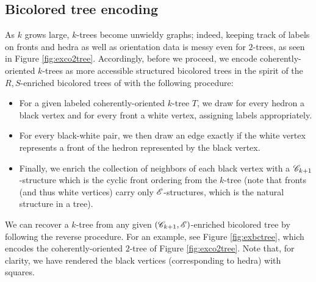 \documentclass[sectionflow,singlespace,twoside,boldmathhdr]{brandiss} %
\numberwithin{section}{chapter}
\numberwithin{figure}{chapter}
\begin{document}
\subsection{Bicolored tree encoding}\label{ss:bctree}
As $k$ grows large, $k$-trees become unwieldy graphs; indeed, keeping track of labels on fronts and hedra as well as orientation data is messy even for $2$-trees, as seen in Figure \ref{fig:exco2tree}.
Accordingly, before we proceed, we encode coherently-oriented $k$-trees as more accessible structured bicolored trees in the spirit of the $R, S$-enriched bicolored trees of \cite[\S 3.2]{bll:species} with the following procedure:
\begin{itemize}
  \item For a given labeled coherently-oriented $k$-tree $T$, we draw for every hedron a black vertex and for every front a white vertex, assigning labels appropriately.
  \item For every black-white pair, we then draw an edge exactly if the white vertex represents a front of the hedron represented by the black vertex.
  \item Finally, we enrich the collection of neighbors of each black vertex with a $\mathscr{C}_{k+1}$-structure which is the cyclic front ordering from the $k$-tree (note that fronts (and thus white vertices) carry only $\mathscr{E}$-structures, which is the natural structure in a tree).
\end{itemize}
We can recover a $k$-tree from any given $\left( {\mathscr{C}_{k+1}, \mathscr{E}} \right)$-enriched bicolored tree by following the reverse procedure.
For an example, see Figure \ref{fig:exbctree}, which encodes the coherently-oriented $2$-tree of Figure \ref{fig:exco2tree}.
Note that, for clarity, we have rendered the black vertices (corresponding to hedra) with squares.
\end{document}
